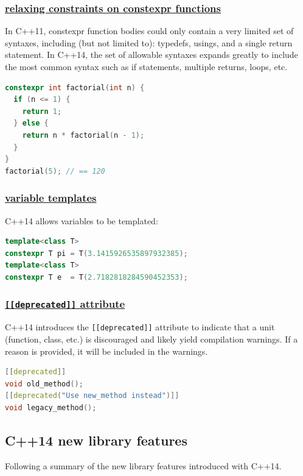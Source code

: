\subsubsection{\href{https://github.com/AnthonyCalandra/modern-cpp-features/tree/master\#relaxing-constraints-on-constexpr-functions}
                    {relaxing constraints on constexpr functions}}
In C++11, constexpr function bodies could only contain a very limited set of syntaxes, including (but not limited to): typedefs, usings, and a single return statement. In C++14, the set of allowable syntaxes expands greatly to include the most common syntax such as if statements, multiple returns, loops, etc.
\begin{lstlisting}[language=C++]
constexpr int factorial(int n) {
  if (n <= 1) {
    return 1;
  } else {
    return n * factorial(n - 1);
  }
}
factorial(5); // == 120
\end{lstlisting}

\subsubsection{\href{https://github.com/AnthonyCalandra/modern-cpp-features/tree/master\#variable-templates}
                    {variable templates}}
C++14 allows variables to be templated:
\begin{lstlisting}[language=C++]
template<class T>
constexpr T pi = T(3.1415926535897932385);
template<class T>
constexpr T e  = T(2.7182818284590452353);
\end{lstlisting}


\subsubsection{\href{https://github.com/AnthonyCalandra/modern-cpp-features/tree/master\#deprecated-attribute}
                    {\texttt{[[deprecated]]} attribute}}
C++14 introduces the \texttt{[[deprecated]]} attribute to indicate that a unit (function, class, etc.) is discouraged and likely yield compilation warnings. If a reason is provided, it will be included in the warnings.
\begin{lstlisting}[language=C++]
[[deprecated]]
void old_method();
[[deprecated("Use new_method instead")]]
void legacy_method();
\end{lstlisting}

\subsection{C++14 new library features}
Following a summary of the new library features introduced with C++14.
